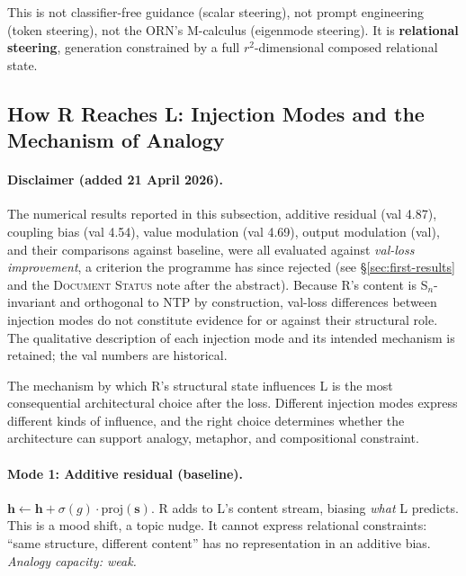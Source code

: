 \documentclass[11pt, a4paper]{article}
\newcommand{\h}{\mathbf{h}}
\theoremstyle{plain}
\theoremstyle{definition}
\theoremstyle{remark}
\begin{document}
This is not classifier-free guidance (scalar steering), not prompt engineering (token steering), not the ORN's M-calculus (eigenmode steering).
It is \textbf{relational steering}, generation constrained by a full $r^2$-dimensional composed relational state.


\subsection{How R Reaches L: Injection Modes and the Mechanism of Analogy}
\label{sec:injection-modes}

\paragraph{Disclaimer (added 21 April 2026).}
The numerical results reported in this subsection, additive residual (val 4.87), coupling bias (val 4.54), value modulation (val 4.69), output modulation (val), and their comparisons against baseline, were all evaluated against \emph{val-loss improvement}, a criterion the programme has since rejected (see \S\ref{sec:first-results} and the \textsc{Document Status} note after the abstract).
Because R's content is S$_n$-invariant and orthogonal to NTP by construction, val-loss differences between injection modes do not constitute evidence for or against their structural role.
The qualitative description of each injection mode and its intended mechanism is retained; the val numbers are historical.

The mechanism by which R's structural state influences L is the most consequential architectural choice after the loss.
Different injection modes express different kinds of influence, and the right choice determines whether the architecture can support analogy, metaphor, and compositional constraint.

\paragraph{Mode 1: Additive residual (baseline).}
$\h \gets \h + \sigma(g) \cdot \mathrm{proj}(\mathbf{s})$.
R adds to L's content stream, biasing \emph{what} L predicts.
This is a mood shift, a topic nudge.
It cannot express relational constraints: ``same structure, different content'' has no representation in an additive bias.
\emph{Analogy capacity: weak.}
\end{document}
